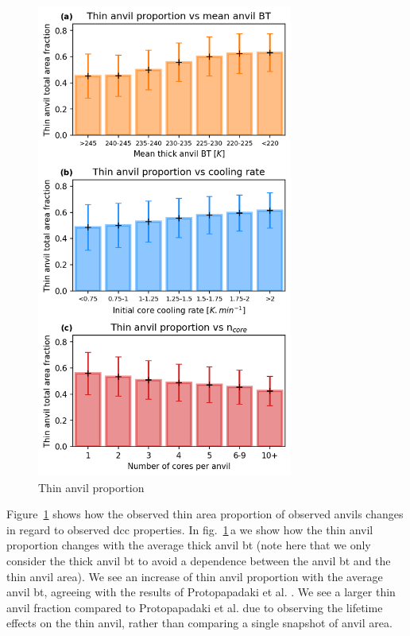 \begin{figure}[tp]
    \centering
    \includegraphics[width=0.75\textwidth]{figures/ch2_20.png}
    \caption{Thin anvil proportion}
    \label{fig:thin_anvil_proportion}
\end{figure}

Figure~\ref{fig:thin_anvil_proportion} shows how the observed thin area proportion of observed anvils changes in regard to observed \acrshort{dcc} properties.
In fig.~\ref{fig:thin_anvil_proportion}\,a we show how the thin anvil proportion changes with the average thick anvil \acrshort{bt} (note here that we only consider the thick anvil \acrshort{bt} to avoid a dependence between the anvil \acrshort{bt} and the thin anvil area).
We see an increase of thin anvil proportion with the average anvil \acrshort{bt}, agreeing with the results of Protopapadaki et al. \cite{missing_Protopapadaki}.
We see a larger thin anvil fraction compared to Protopapadaki et al. due to observing the lifetime effects on the thin anvil, rather than comparing a single snapshot of anvil area.

